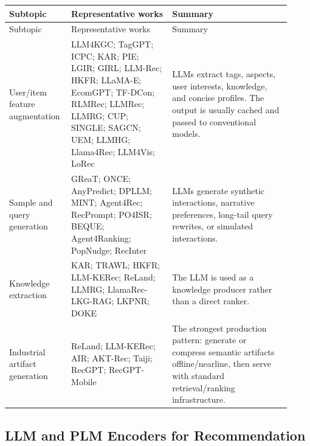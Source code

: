 \documentclass[11pt]{article}
\begin{document}
\small
\begin{longtable}{@{}p{0.18\linewidth}p{0.34\linewidth}p{0.40\linewidth}@{}}
\toprule
Subtopic & Representative works & Summary\\
\midrule
\endfirsthead
\toprule
Subtopic & Representative works & Summary\\
\midrule
\endhead
User/item feature augmentation & LLM4KGC; TagGPT; ICPC; KAR; PIE; LGIR; GIRL; LLM-Rec; HKFR; LLaMA-E; EcomGPT; TF-DCon; RLMRec; LLMRec; LLMRG; CUP; SINGLE; SAGCN; UEM; LLMHG; Llama4Rec; LLM4Vis; LoRec & LLMs extract tags, aspects, user interests, knowledge, and concise profiles. The output is usually cached and passed to conventional models.\\
Sample and query generation & GReaT; ONCE; AnyPredict; DPLLM; MINT; Agent4Rec; RecPrompt; PO4ISR; BEQUE; Agent4Ranking; PopNudge; RecInter & LLMs generate synthetic interactions, narrative preferences, long-tail query rewrites, or simulated interactions.\\
Knowledge extraction & KAR; TRAWL; HKFR; LLM-KERec; ReLand; LLMRG; LlamaRec-LKG-RAG; LKPNR; DOKE & The LLM is used as a knowledge producer rather than a direct ranker.\\
Industrial artifact generation & ReLand; LLM-KERec; AIR; AKT-Rec; Taiji; RecGPT; RecGPT-Mobile & The strongest production pattern: generate or compress semantic artifacts offline/nearline, then serve with standard retrieval/ranking infrastructure.\\
\bottomrule
\end{longtable}
\normalsize

\subsection{LLM and PLM Encoders for Recommendation}
\end{document}
